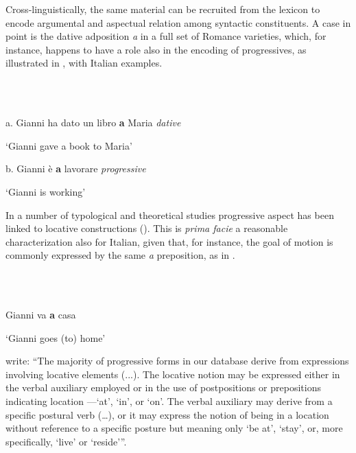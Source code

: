 \documentclass[output=paper,colorlinks,citecolor=brown]{./langscibook}
\begin{document}
Cross-linguistically, the same material can be recruited from the lexicon to encode argumental and aspectual relation among syntactic constituents. A case in point is the dative adposition \textit{a} in a full set of Romance varieties, which, for instance, happens to have a role also in the encoding of progressives, as illustrated in , with Italian examples.

\ea%
    \label{ex:key:10}
    \gll\\
        \\
    \glt
    \z

           a.  Gianni ha dato un libro \textbf{a} Maria    \textit{dative}

    ‘Gianni gave a book to Maria’

b.  Gianni è \textbf{a} lavorare         \textit{progressive}

  ‘Gianni is working’

In a number of typological and theoretical studies progressive aspect has been linked to locative constructions (\citealt{BybeeEtAl1994, MateuAmadas1999, DemirdacheUribe-Etxebarria1997}).  This is \textit{prima facie} a reasonable characterization also for Italian, given that, for instance, the goal of motion is commonly expressed by the same \textit{a} preposition, as in .

\ea%
    \label{ex:key:11}
    \gll\\
        \\
    \glt
    \z

           Gianni va \textbf{a} casa

  ‘Gianni goes (to) home’

\citet[129-130]{BybeeEtAl1994} write: “The majority of progressive forms in our database derive from expressions involving locative elements (...). The locative notion may be expressed either in the verbal auxiliary employed or in the use of postpositions or prepositions indicating location —‘at’, ‘in’, or ‘on’. The verbal auxiliary may derive from a specific postural verb (…), or it may express the notion of being in a location without reference to a specific posture but meaning only ‘be at’, ‘stay’, or, more specifically, ‘live’ or ‘reside’”.
\end{document}
